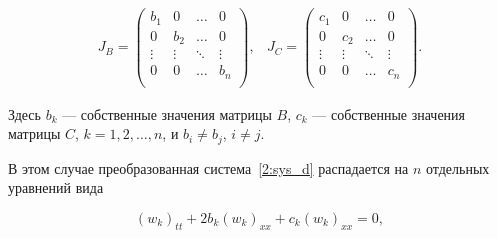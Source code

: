\begin{equation*}

\label{kozlova:J_B_C}

\begin{array}{cc}

J_B=\left(

  \begin{array}{cccc}

    b_1    & 0      & \ldots & 0 \\

    0      & b_2    & \ldots & 0 \\

    \vdots & \vdots & \ddots & \vdots \\

    0      & 0      & \ldots & b_n \\

  \end{array}

\right),

&

J_{C}=\left(

  \begin{array}{cccc}

    c_1    & 0      & \ldots & 0 \\

    0      & c_2    & \ldots & 0 \\

    \vdots & \vdots & \ddots & \vdots \\

    0      & 0      & \ldots & c_n \\

  \end{array}

\right).

\end{array}

\end{equation*}

Здесь $b_k$  --- собственные значения матрицы $B$, $c_k$ --- собственные значения матрицы $C$, $k={1, 2, \dots, n}$, и $b_i\neq b_j$, $i\neq j$.

В этом случае преобразованная система~\eqref{2:sys_d} распадается на $n$ отдельных уравнений вида

\begin{equation}

\label{2:sys_BC_d_k}

(w_k)_{tt}+2b_k(w_k)_{xx}+c_k(w_k)_{xx}=0,

\end{equation}

